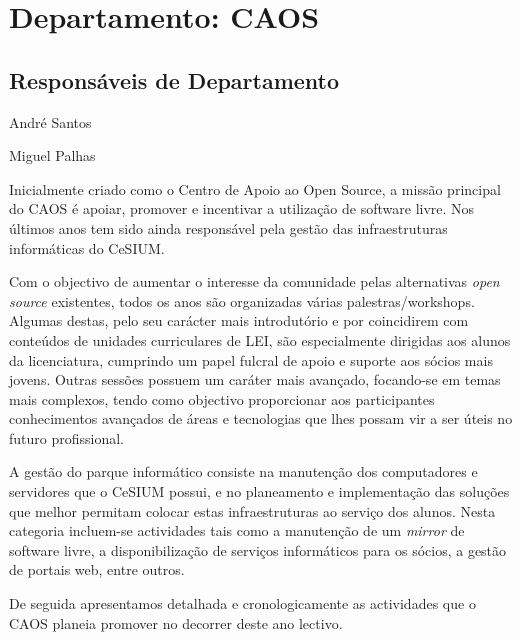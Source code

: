\section{Departamento: CAOS}

\subsection{Responsáveis de Departamento}
\begin{itemizedash}
	\item André Santos
	\item Miguel Palhas
\end{itemizedash}


\indent Inicialmente criado como o Centro de Apoio ao Open Source, a missão principal do CAOS é apoiar, promover e incentivar a utilização de software livre. Nos últimos anos tem sido ainda responsável pela gestão das infraestruturas informáticas do CeSIUM.

Com o objectivo de aumentar o interesse da comunidade pelas alternativas \textit{open source} existentes, todos os anos são organizadas várias palestras/workshops. Algumas destas, pelo seu carácter mais introdutório e por coincidirem com conteúdos de unidades curriculares de LEI, são especialmente dirigidas aos alunos da licenciatura, cumprindo um papel fulcral de apoio e suporte aos sócios mais jovens. Outras sessões possuem um caráter mais avançado, focando-se em temas mais complexos, tendo como objectivo proporcionar aos participantes conhecimentos avançados de áreas e tecnologias que lhes possam vir a ser úteis no futuro profissional.

A gestão do parque informático consiste na manutenção dos computadores e servidores que o CeSIUM possui, e no planeamento e implementação das soluções que melhor permitam colocar estas infraestruturas ao serviço dos alunos. Nesta categoria incluem-se actividades tais como a manutenção de um \textit{mirror} de software livre, a disponibilização de serviços informáticos para os sócios, a gestão de portais web, entre outros. 

De seguida apresentamos detalhada e cronologicamente as actividades que o CAOS planeia promover no decorrer deste ano lectivo.
